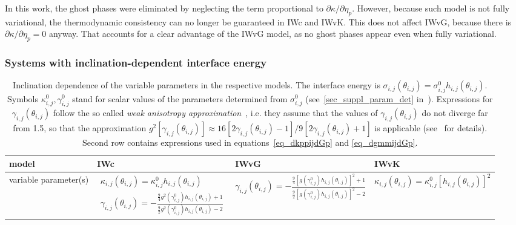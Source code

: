 In this work, the ghost phases were eliminated by neglecting the term proportional to $\partial \kappa/\partial \eta_p$. However, because such model is not fully variational, the thermodynamic consistency can no longer be guaranteed in IWc and IWvK. This does not affect IWvG, because there is $\partial \kappa/\partial\eta_p=0$ anyway. That accounts for a clear advantage of the IWvG model, as no ghost phases appear even when fully variational.

\subsubsection{Systems with inclination-dependent interface energy} \label{sec_model_incldepIE}
\begin{table*}[]
	\centering
	\caption{Inclination dependence of the variable parameters in the respective models. The interface energy is $\sigma_{i,j}(\theta_{i,j})=\sigma_{i,j}^0h_{i,j}(\theta_{i,j})$. Symbols $\kappa_{i,j}^0, \gamma_{i,j}^0$ stand for scalar values of the parameters determined from $\sigma_{i,j}^0$ (see~\ref{sec_suppl_param_det} in~\cite{Minar2021suppl}). Expressions for $\gamma_{i,j}(\theta_{i,j})$ follow the so called \textit{weak anisotropy approximation}~\cite{Moelans2008}, i.e. they assume that the values of $\gamma_{i,j}(\theta_{i,j})$ do not diverge far from 1.5, so that the approximation $g^2[\gamma_{i,j}(\theta_{i,j})]\approx16[2\gamma_{i,j}(\theta_{i,j})-1]/9[2\gamma_{i,j}(\theta_{i,j}) +1]$ is applicable (see~\cite{Moelans2008} for details). Second row contains expressions used in equations~\ref{eq_dkppijdGp} and \ref{eq_dgmmijdGp}.}
	\label{tab_models_comp__par_incldep}
	\begin{tabular}{p{2cm}|>{\centering\arraybackslash}p{4cm}>{\centering\arraybackslash}p{4.3cm}>{\centering\arraybackslash}p{3.5cm}}
		model     & IWc & IWvG & IWvK  \\ \hline
		variable parameter(s)     & $\begin{array}{l}
			\kappa_{i,j}(\theta_{i,j})= \kappa_{i,j}^0h_{i,j}(\theta_{i,j}) \\
			\gamma_{i,j}(\theta_{i,j})= -\frac{\frac{9}{4}g^2(\gamma_{i,j}^0)h_{i,j}(\theta_{i,j})+1}{\frac{9}{2}g^2(\gamma_{i,j}^0)h_{i,j}(\theta_{i,j})-2}
		\end{array}$
		& $\gamma_{i,j}(\theta_{i,j})= -\frac{\frac{9}{4}[g(\gamma_{i,j}^0)h_{i,j}(\theta_{i,j})]^2+1}{\frac{9}{2}[g(\gamma_{i,j}^0)h_{i,j}(\theta_{i,j})]^2-2}$
		&
		$\kappa_{i,j}(\theta_{i,j})= \kappa_{i,j}^0[h_{i,j}(\theta_{i,j})]^2$ \\ \hline

\end{tabular}
\end{table*}
